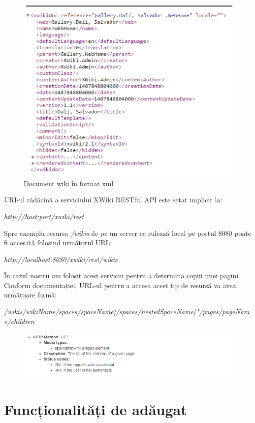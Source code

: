 \begin{figure}[h]
  \centering
  \includegraphics[scale=1.2]{img/xpagexml.png}
  \caption{Document wiki în format xml}
\end{figure}
\clearpage

URI-ul rădăcină a serviciului XWiki RESTful API este setat implicit la:

\textit{http://host:port/xwiki/rest}

Spre exemplu resursa \textit{/wikis} de pe un server ce rulează local pe portul 8080 poate fi accesată folosind următorul URL:

\textit{http://localhost:8080/xwiki/rest/wikis}

În cazul nostru am folosit acest serviciu pentru a determina copiii unei pagini. Conform documentației, URL-ul pentru a accesa acest tip de resursă va avea următoare formă:

\textit{/wikis/{wikiName}/spaces/{spaceName}[/spaces/{nestedSpaceName}]*/pages/{pageName}/children}

\begin{figure}[h]
  \centering
  \includegraphics[scale=1]{img/restAPI.png}
\end{figure}

\section{Funcționalități de adăugat}

